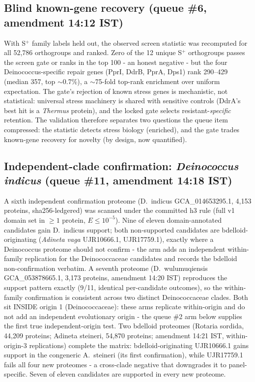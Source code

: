 \documentclass[12pt,a4paper]{article}
\begin{document}
\subsection{Blind known-gene recovery (queue \#6, amendment 14:12 IST)}
With S$^+$ family labels held out, the observed screen statistic was recomputed for all 52{,}786 orthogroups and ranked. Zero of the 12 unique S$^+$ orthogroups passes the screen gate or ranks in the top 100 - an honest negative - but the four Deinococcus-specific repair genes (PprI, DdrB, PprA, Dps1) rank 290--429 (median 357, top $\sim$0.7\%), a $\sim$75-fold top-rank enrichment over uniform expectation. The gate's rejection of known stress genes is mechanistic, not statistical: universal stress machinery is shared with sensitive controls (DdrA's best hit is a \emph{Thermus} protein), and the locked gate selects resistant-\emph{specific} retention. The validation therefore separates two questions the queue item compressed: the statistic detects stress biology (enriched), and the gate trades known-gene recovery for novelty (by design, now quantified).

\subsection{Independent-clade confirmation: \emph{Deinococcus indicus} (queue \#11, amendment 14:18 IST)}
A sixth independent confirmation proteome (D.\ indicus GCA\_014653295.1, 4{,}153 proteins, sha256-ledgered) was scanned under the committed h3 rule (full v1 domain set in $\geq 1$ protein, $E \leq 10^{-5}$). Nine of eleven domain-annotated candidates gain D.\ indicus support; both non-supported candidates are bdelloid-originating (\emph{Adineta vaga} UJR10666.1, UJR17759.1), exactly where a Deinococcus proteome should not confirm - the arm adds an independent within-family replication for the Deinococcaceae candidates and records the bdelloid non-confirmation verbatim. A seventh proteome (D.\ wulumuqiensis GCA\_053878665.1, 3{,}173 proteins, amendment 14:20 IST) reproduces the support pattern exactly (9/11, identical per-candidate outcomes), so the within-family confirmation is consistent across two distinct Deinococcaceae clades. Both sit INSIDE origin 1 (Deinococcaceae): these arms replicate within-origin and do not add an independent evolutionary origin - the queue \#2 arm below supplies the first true independent-origin test.
Two bdelloid proteomes (Rotaria sordida, 44{,}209 proteins; Adineta steineri, 54{,}870 proteins; amendment 14:21 IST, within-origin-3 replications) complete the matrix: bdelloid-originating UJR10666.1 gains support in the congeneric A.\ steineri (its first confirmation), while UJR17759.1 fails all four new proteomes - a cross-clade negative that downgrades it to panel-specific. Seven of eleven candidates are supported in every new proteome.
\end{document}
